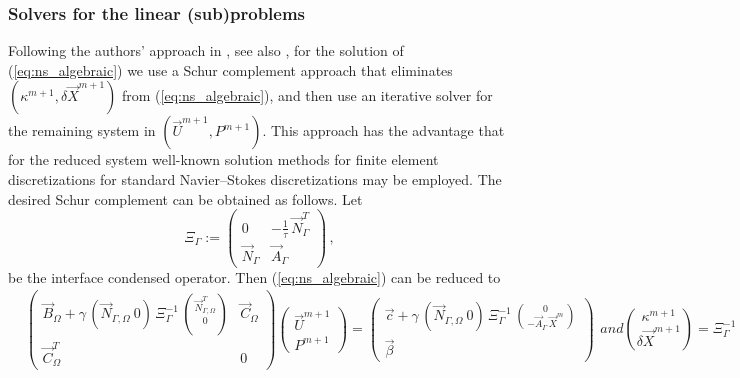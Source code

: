 \documentclass[a4paper,12pt,onecolumn]{article}
\newcommand{\NbulkT}{\vec{N}_{\Gamma,\Omega}^T}
\newcommand{\Nbulk}{\vec{N}_{\Gamma,\Omega}}
\begin{document}
\subsubsection{Solvers for the linear (sub)problems}
Following the authors' approach in \cite{stokesfitted}, see also
\cite{fluidfbp,spurious},
for the solution of (\ref{eq:ns_algebraic}) we use a Schur complement
approach that eliminates $(\kappa^{m+1}, \delta \vec X^{m+1})$ from
(\ref{eq:ns_algebraic}), and then use an iterative solver for the remaining
system in $(\vec U^{m+1}, P^{m+1})$. This approach has the advantage that for
the reduced system well-known solution methods for finite element
discretizations for standard Navier--Stokes discretizations may be employed.
The desired Schur complement can be obtained as follows. Let
\begin{equation} \label{eq:Xi}
\Xi_\Gamma:= \begin{pmatrix}
 0 & - \frac1{\tau}\,\vec N_\Gamma^T \\
\vec N_\Gamma & \vec A_\Gamma
\end{pmatrix} \,,
\end{equation}
be the interface condensed operator. Then (\ref{eq:ns_algebraic}) can be
reduced to
\begin{subequations}
\begin{align}\label{eq:SchurkX}
&
\begin{pmatrix}
\vec B_\Omega + \gamma\,(\Nbulk \ 0)\,\Xi_\Gamma^{-1}\,
\binom{\NbulkT}{0} & \vec C_\Omega \\
\vec C_\Omega^T & 0
\end{pmatrix}
\begin{pmatrix}
\vec U^{m+1} \\ P^{m+1}
\end{pmatrix}
= %
\begin{pmatrix}
\vec c
+\gamma\,(\Nbulk \ 0)\, \Xi_\Gamma^{-1}\,
\binom{0}{-\vec A_\Gamma\,\vec X^m} \\
\vec \beta
\end{pmatrix}
\end{align}
and
\begin{equation}
\binom{\kappa^{m+1}}{\delta\vec X^{m+1}} = \Xi_\Gamma^{-1}\,
\binom{-\NbulkT\,\vec U^{m+1}}{-\vec A_\Gamma\,\vec X^m}\,.
\label{eq:SchurkXb}
\end{equation}
\end{subequations}
\end{document}
